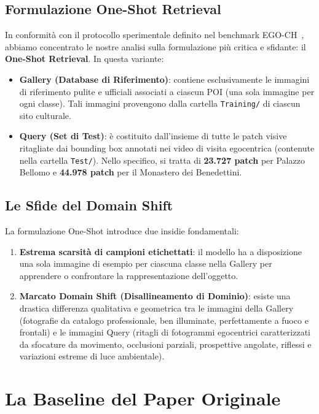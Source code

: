 \documentclass[a4paper,12pt]{report}
\begin{document}
\subsection{Formulazione One-Shot Retrieval}

In conformità con il protocollo sperimentale definito nel benchmark EGO-CH~\cite{egoref}, abbiamo concentrato le nostre analisi sulla formulazione più critica e sfidante: il \textbf{One-Shot Retrieval}.
In questa variante:
\begin{itemize}
    \item \textbf{Gallery (Database di Riferimento)}: contiene esclusivamente le immagini di riferimento pulite e ufficiali associati a ciascun POI (una sola immagine per ogni classe). Tali immagini provengono dalla cartella \texttt{Training/} di ciascun sito culturale.
    \item \textbf{Query (Set di Test)}: è costituito dall'insieme di tutte le patch visive ritagliate dai bounding box annotati nei video di visita egocentrica (contenute nella cartella \texttt{Test/}). Nello specifico, si tratta di \textbf{23.727 patch} per Palazzo Bellomo e \textbf{44.978 patch} per il Monastero dei Benedettini.
\end{itemize}

\subsection{Le Sfide del Domain Shift}

La formulazione One-Shot introduce due insidie fondamentali:
\begin{enumerate}
    \item \textbf{Estrema scarsità di campioni etichettati}: il modello ha a disposizione una sola immagine di esempio per ciascuna classe nella Gallery per apprendere o confrontare la rappresentazione dell'oggetto.
    \item \textbf{Marcato Domain Shift (Disallineamento di Dominio)}: esiste una drastica differenza qualitativa e geometrica tra le immagini della Gallery (fotografie da catalogo professionale, ben illuminate, perfettamente a fuoco e frontali) e le immagini Query (ritagli di fotogrammi egocentrici caratterizzati da sfocature da movimento, occlusioni parziali, prospettive angolate, riflessi e variazioni estreme di luce ambientale).
\end{enumerate}

\section{La Baseline del Paper Originale}
\end{document}

